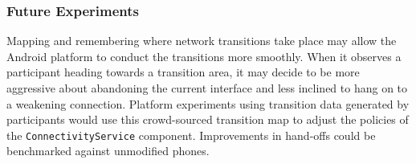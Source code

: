 \subsubsection{Future Experiments}

Mapping and remembering where network transitions take place may allow the
Android platform to conduct the transitions more smoothly. When it observes a
participant heading towards a transition area, it may decide to be more
aggressive about abandoning the current interface and less inclined to hang on
to a weakening connection. Platform experiments using transition data
generated by \PhoneLab{} participants would use this crowd-sourced transition
map to adjust the policies of the \texttt{ConnectivityService} component.
Improvements in hand-offs could be benchmarked against unmodified \PhoneLab{}
phones.
